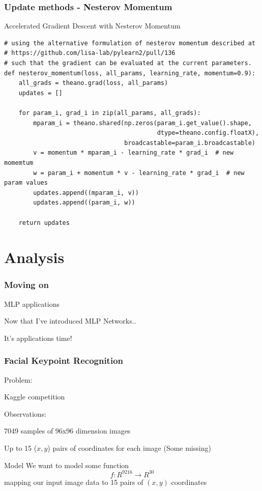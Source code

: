 \documentclass{beamer}
\begin{document}
\begin{frame}[fragile]
    \frametitle{Update methods - Nesterov Momentum}
    \begin{block}{Accelerated Gradient Descent with Nesterov Momentum}
    \begin{verbatim}
# using the alternative formulation of nesterov momentum described at
# https://github.com/lisa-lab/pylearn2/pull/136
# such that the gradient can be evaluated at the current parameters.
def nesterov_momentum(loss, all_params, learning_rate, momentum=0.9):
    all_grads = theano.grad(loss, all_params)
    updates = []

    for param_i, grad_i in zip(all_params, all_grads):
        mparam_i = theano.shared(np.zeros(param_i.get_value().shape,
                                          dtype=theano.config.floatX),
                                 broadcastable=param_i.broadcastable)
        v = momentum * mparam_i - learning_rate * grad_i  # new momemtum
        w = param_i + momentum * v - learning_rate * grad_i  # new param values
        updates.append((mparam_i, v))
        updates.append((param_i, w))

    return updates
\end{verbatim}
\end{block}
\end{frame}


\section{Analysis}


\begin{frame}
    \frametitle{Moving on}
    \begin{block}{MLP applications}
    \item Now that I've introduced MLP Networks..
    \item It's applications time!
    \end{block}
\end{frame}

\begin{frame}
    \frametitle{Facial Keypoint Recognition}
    \begin{block}{Problem:}
    \item Kaggle competition
    \end{block}
    \begin{block}{Observations:}
    \item 7049 samples of 96x96 dimension images
    \item Up to 15 ($x,y$) pairs of coordinates for each image (Some missing)
    \end{block}
    \begin{block}{Model} We want to model some function $$f : R^{9216} \rightarrow R^{30}$$
    mapping our input image data to 15 pairs of $(x,y)$ coordinates 
    \end{block}
\end{frame}
\end{document}
